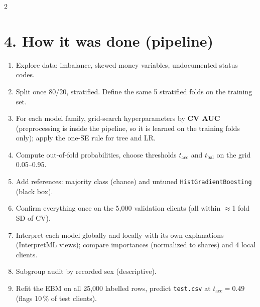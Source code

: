 \documentclass[a4paper,9pt]{extarticle}
\begin{document}
\begin{multicols}{2}
\section{4. How it was done (pipeline)}
\begin{enumerate}[leftmargin=1.3em]
\item Explore data: imbalance, skewed money variables, undocumented status codes.
\item Split once 80/20, stratified. Define the same 5 stratified folds on the training set.
\item For each model family, grid-search hyperparameters by \textbf{CV AUC} (preprocessing is inside the
      pipeline, so it is learned on the training folds only); apply the one-SE rule for tree and LR.
\item Compute out-of-fold probabilities, choose thresholds $t_{\text{acc}}$ and $t_{\text{bal}}$ on the grid
      0.05--0.95.
\item Add references: majority class (chance) and untuned \texttt{HistGradientBoosting} (black box).
\item Confirm everything once on the 5{,}000 validation clients (all within $\approx$1 fold SD of CV).
\item Interpret each model globally and locally with its own explanations (InterpretML views); compare
      importances (normalized to shares) and 4 local clients.
\item Subgroup audit by recorded sex (descriptive).
\item Refit the EBM on all 25{,}000 labelled rows, predict \texttt{test.csv} at $t_{\text{acc}} = 0.49$
      (flags 10\,\% of test clients).
\end{enumerate}


\end{multicols}
\end{document}
